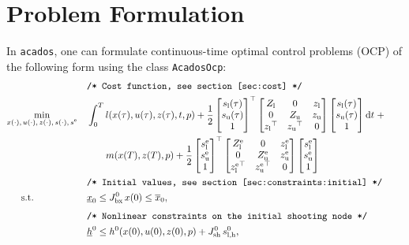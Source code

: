 \documentclass[english]{article}
\newcommand{\acados}{\texttt{acados}}
\newcommand{\tran}{^\top}
\newcommand{\ind}[1]{_{\textrm{#1}}}
\newcommand{\terminal}{^{\textrm{e}}}
\newcommand{\initial}{^{\textrm{0}}}
\newcommand{\matr}[1]{\begin{bmatrix}#1\end{bmatrix}}
\newcommand{\Lower}{\ind{l}}
\newcommand{\lowerh}{\ind{l,h}}
\newcommand{\upper}{\ind{u}}
\newcommand{\mathComment}[1]{\texttt{/* #1 */}}
\begin{document}
%
\section{Problem Formulation}\label{sec:problem}
%
In \acados{}, one can formulate continuous-time optimal control problems (OCP) of the following form using the class \texttt{AcadosOcp}:
%
\begin{align}
    &&&\mathComment{Cost function, see section \ref{sec:cost}}\nonumber\\
    &\underset{\begin{subarray}{c}
        x(\cdot),\,u(\cdot), \, z(\cdot), \, s(\cdot), \, s\terminal
        \end{subarray}}{\min}
    &&\int_0^T l(x(\tau), u(\tau), z(\tau), t, p)
     + \frac{1}{2} \matr{s\Lower(\tau) \\ s\upper(\tau) \\ 1} \tran
      \matr{ Z\Lower & 0 & z\Lower \\
      0 & Z\upper & z\upper \\
        {z\Lower}\tran & {z\upper}\tran & 0}
    \matr{s\Lower(\tau) \\ s\upper(\tau) \\ 1} \mathrm{d}t \; + \nonumber\\
     &&& \quad \quad m(x(T), z(T), p) +
      \frac{1}{2} \matr{s\Lower\terminal \\ s\upper\terminal \\ 1} \tran
     \matr{ Z\Lower\terminal & 0 & z\Lower\terminal \\
         0 & Z\upper\terminal & z\upper\terminal \\
         {z\Lower\terminal}\tran & {z\upper\terminal}\tran & 0}
     \matr{s\Lower\terminal \\ s\upper\terminal \\ 1}
     \label{eq:cost}\\
    &&&\mathComment{Initial values, see section \ref{sec:constraints:initial}}\nonumber\\
    &\,\,\,\quad \text{s.t.}    &&\underline{x}_0 \leq J\ind{bx}\initial \, x(0) \leq \overline{x}_0 , && \label{eq:constraints:initial}\\[1ex]
    &&&\mathComment{Nonlinear constraints on the initial shooting node} \nonumber\\
    &&&\underline{h}\initial \leq h\initial(x(0), u(0), z(0), p) + J_{\textrm{sh}}\initial \, s\lowerh\initial, &&\label{eq:constraints:path:lower_bounds:start}\\

\end{align}
\end{document}
